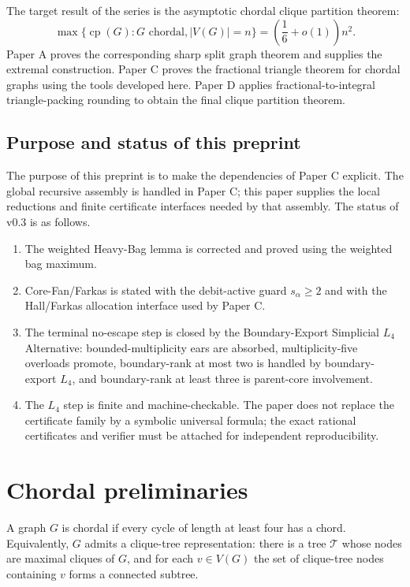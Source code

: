 \documentclass[11pt]{article}
\theoremstyle{definition}
\newcommand{\cp}{\operatorname{cp}}
\newcommand{\calT}{\mathcal T}
\begin{document}
The target result of the series is the asymptotic chordal clique partition theorem:
\[
    \max\{\cp(G):G\text{ chordal}, |V(G)|=n\}
    =
    \left(\frac16+o(1)\right)n^2.
\]
Paper A proves the corresponding sharp split graph theorem and supplies the extremal construction. Paper C proves the fractional triangle theorem for chordal graphs using the tools developed here. Paper D applies fractional-to-integral triangle-packing rounding to obtain the final clique partition theorem.

\subsection*{Purpose and status of this preprint}

The purpose of this preprint is to make the dependencies of Paper C explicit. The global recursive assembly is handled in Paper C; this paper supplies the local reductions and finite certificate interfaces needed by that assembly. The status of v0.3 is as follows.
\begin{enumerate}[label=(\roman*)]
    \item The weighted Heavy-Bag lemma is corrected and proved using the weighted bag maximum.
    \item Core-Fan/Farkas is stated with the debit-active guard \(s_\alpha\ge2\) and with the Hall/Farkas allocation interface used by Paper C.
    \item The terminal no-escape step is closed by the Boundary-Export Simplicial \(L_4\) Alternative: bounded-multiplicity ears are absorbed, multiplicity-five overloads promote, boundary-rank at most two is handled by boundary-export \(L_4\), and boundary-rank at least three is parent-core involvement.
    \item The \(L_4\) step is finite and machine-checkable. The paper does not replace the certificate family by a symbolic universal formula; the exact rational certificates and verifier must be attached for independent reproducibility.
\end{enumerate}

\section{Chordal preliminaries}


A graph \(G\) is chordal if every cycle of length at least four has a chord. Equivalently, \(G\) admits a clique-tree representation: there is a tree \(\calT\) whose nodes are maximal cliques of \(G\), and for each \(v\in V(G)\) the set of clique-tree nodes containing \(v\) forms a connected subtree.
\end{document}
